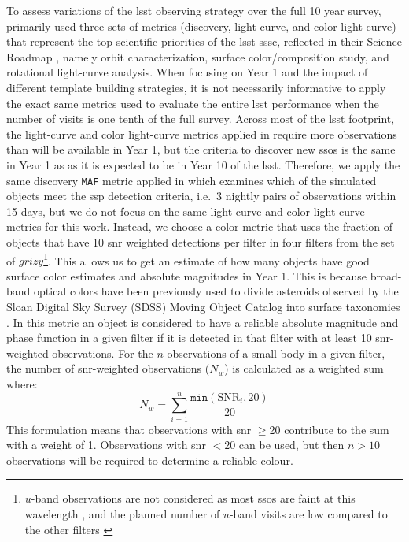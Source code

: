 \documentclass[preprintm,linenumbers]{aastex631}
\newcommand{\maf}{\texttt{MAF}\xspace}
\begin{document}
To assess variations of the \gls*{lsst} observing strategy over the full 10 year survey, \cite{schwambTuningLegacySurvey2023} primarily used three sets of metrics (discovery, light-curve, and color light-curve) that represent the top scientific priorities of the \gls*{lsst} \gls*{sssc}, reflected in their Science Roadmap \citep{2018arXiv180201783S}, namely orbit characterization, surface color/composition study, and rotational light-curve analysis. 
When focusing on Year 1 and the impact of different template building strategies, it is not necessarily informative to apply the exact same metrics used to evaluate the entire \gls*{lsst} performance when the number of visits is one tenth of the full survey. 
Across most of the \gls*{lsst} footprint, the light-curve and color light-curve metrics applied in \cite{schwambTuningLegacySurvey2023} require more observations than will be available in Year 1, but the criteria to discover new \glspl*{sso} is the same in Year 1 as as it is expected to be in Year 10 of the \gls*{lsst}. 
Therefore, we apply the same discovery \maf metric applied in \cite{schwambTuningLegacySurvey2023} which examines which of the simulated objects meet the \gls*{ssp} detection criteria, i.e.\ 3 nightly pairs of observations within 15 days, but we do not focus on the same light-curve and color light-curve metrics for this work. 
Instead, we choose a color metric that uses the fraction of objects that have 10 \gls*{snr} weighted detections per filter in four filters from the set of $grizy$\footnote{$u$-band observations are not considered as most \glspl*{sso} are faint at this wavelength \citep[e.g.;][]{2013Icar..226..723D,2008ssbn.book..181F}, and the planned number of $u$-band visits are low compared to the other filters \citep{SCOC_Report_3}}. 
This allows us to get an estimate of how many objects have good surface color estimates and absolute magnitudes in Year 1. 
This is because broad-band optical colors have been previously used to divide asteroids observed by the Sloan Digital Sky Survey (SDSS) Moving Object Catalog \citep{2001AJ....122.2749I,2002AJ....124.2943I,juricComparisonPositionsMagnitudes2002} into surface taxonomies \citep{2013Icar..226..723D,sergeyevMillionAsteroidObservations2021}. 
In this metric an object is considered to have a reliable absolute magnitude and phase function in a given filter if it is detected in that filter with at least 10 \gls*{snr}-weighted observations. 
For the $n$ observations of a small body in a given filter, the number of \gls*{snr}-weighted observations ($N_w$) is calculated as a weighted sum where:
\begin{equation}
	N_w =  \sum_{i=1}^n\frac{\texttt{min}(\mathrm{SNR}_i, 20)}{20}
\end{equation}
This formulation means that observations with \gls*{snr} $\ge$20 contribute to the sum with a weight of 1.
Observations with \gls*{snr} $<20$ can be used, but then $n>10$ observations will be required to determine a reliable colour.
\end{document}
